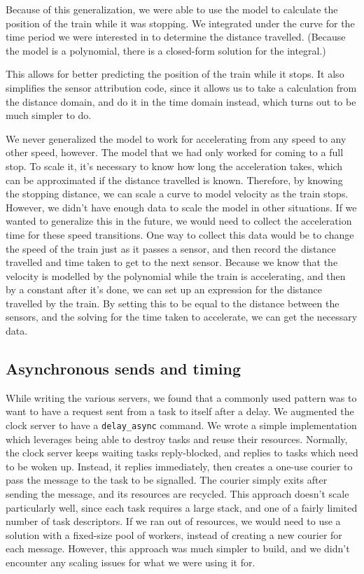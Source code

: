 \documentclass{article}
\begin{document}
Because of this generalization, we were able to use the model
to calculate the position of the train while it was stopping.
We integrated under the curve for the time period we were interested
in to determine the distance travelled.
(Because the model is a polynomial, there is a closed-form solution
for the integral.)

This allows for better predicting the position of the train
while it stops.
It also simplifies the sensor attribution code, since it allows
us to take a calculation from the distance domain, and do it in
the time domain instead, which turns out to be much simpler to do.

We never generalized the model to work for accelerating from any
speed to any other speed, however.
The model that we had only worked for coming to a full stop.
To scale it, it's necessary to know how long the acceleration takes,
which can be approximated if the distance travelled is known.
Therefore, by knowing the stopping distance, we can scale a curve
to model velocity as the train stops.
However, we didn't have enough data to scale the model in other
situations.
If we wanted to generalize this in the future, we would need to collect the acceleration time for these speed transitions.
One way to collect this data would be to change the speed of
the train just as it passes a sensor, and then record
the distance travelled and time taken to get to the next sensor.
Because we know that the velocity is modelled by the polynomial while
the train is accelerating, and then by a constant after it's done,
we can set up an expression for the distance travelled by the train.
By setting this to be equal to the distance between the sensors, and the solving for the time taken to accelerate, we can get the necessary data.

\subsection{Asynchronous sends and timing}
While writing the various servers, we found that a commonly used pattern was to want to have a request sent from a task
to itself after a delay.
We augmented the clock server to have a \texttt{delay\_async} command.
We wrote a simple implementation which leverages being able to destroy tasks and reuse their resources.
Normally, the clock server keeps waiting tasks reply-blocked, and replies to tasks which need to be woken up.
Instead, it replies immediately, then creates a one-use courier to pass the message to the task to be signalled.
The courier simply exits after sending the message, and its resources are recycled.
This approach doesn't scale particularly well, since each task requires a large stack, and one of a fairly limited number of task descriptors.
If we ran out of resources, we would need to use a solution with a fixed-size pool of workers, instead of
creating a new courier for each message.
However, this approach was much simpler to build, and we didn't encounter any scaling issues for what we were
using it for.
\end{document}
